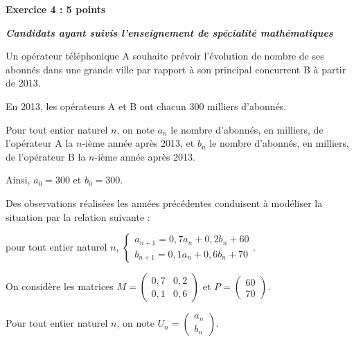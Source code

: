 \documentclass[10pt]{article}
\begin{document}
\newpage

\textbf{Exercice 4 :  \hfill 5 points}

\emph{\bfseries Candidats ayant suivis l'enseignement de spécialité mathématiques}

\medskip

Un opérateur téléphonique A souhaite prévoir l'évolution de nombre de ses abonnés dans une grande ville par rapport à son principal concurrent B à partir de 2013.

En 2013, les opérateurs A et B ont chacun $300$ milliers d'abonnés.

\medskip

Pour tout entier naturel $n$, on note $a_n$ le nombre d'abonnés, en milliers, de l'opérateur A la $n$-ième année après 2013, et $b_n$ le nombre d'abonnés, en milliers, de l'opérateur B la $n$-ième année après 2013.

Ainsi, $a_0 = 300$ et $b_0 = 300$.

\medskip

Des observations réalisées les années précédentes conduisent à modéliser la situation par la relation suivante :

pour tout entier naturel $n$, 
$\begin{cases}
a_{n+1} = 0,7a_n + 0,2b_n + 60 \\
b_{n+1} = 0,1a_n + 0,6b_n + 70
\end{cases}$.

\medskip

On considère les matrices $M = 
\begin{pmatrix}
  0,7 & 0,2 \\ 0,1 & 0,6
\end{pmatrix}$ et $P =
\begin{pmatrix}
  60 \\ 70
\end{pmatrix}$.

Pour tout entier naturel $n$, on note $U_n =
\begin{pmatrix}
  a_n \\ b_n
\end{pmatrix}$.
\end{document}
